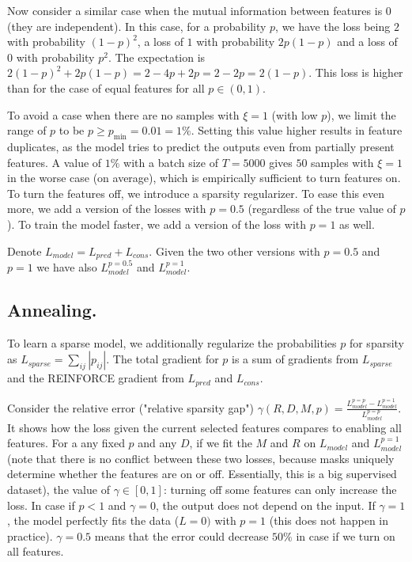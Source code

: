 \documentclass[a4paper,11pt,oneside]{report}
\begin{document}
Now consider a similar case when the mutual information between features is $0$ (they are independent). In this case, for a probability $p$, we have the loss being $2$ with probability $(1-p)^2$, a loss of $1$ with probability $2p(1-p)$ and a loss of $0$ with probability $p^2$. The expectation is $2(1-p)^2+2p(1-p)=2-4p+2p=2-2p=2(1-p)$. This loss is higher than for the case of equal features for all $p\in (0,1)$.

To avoid a case when there are no samples with $\xi=1$ (with low $p$), we limit the range of $p$ to be $p\geq p_{\min}=0.01=1\%$. Setting this value higher results in feature duplicates, as the model tries to predict the outputs even from partially present features. A value of $1\%$ with a batch size of $T=5000$ gives $50$ samples with $\xi=1$ in the worse case (on average), which is empirically sufficient to turn features on. To turn the features off, we introduce a sparsity regularizer. To ease this even more, we add a version of the losses with $p=0.5$ (regardless of the true value of $p$). To train the model faster, we add a version of the loss with $p=1$ as well.

Denote $L_{model}=L_{pred}+L_{cons}$. Given the two other versions with $p=0.5$ and $p=1$ we have also $L_{model}^{p=0.5}$ and $L_{model}^{p=1}$.

\subsection{Annealing.} To learn a sparse model, we additionally regularize the probabilities $p$ for sparsity as $L_{sparse}=\sum_{ij}|p_{ij}|$. The total gradient for $p$ is a sum of gradients from $L_{sparse}$ and the REINFORCE gradient from $L_{pred}$ and $L_{cons}$.

Consider the relative error ("relative sparsity gap") $\gamma(R, D, M, p)=\frac{L_{model}^{p=p}-L_{model}^{p=1}}{L_{model}^{p=p}}$. It shows how the loss given the current selected features compares to enabling all features. For a any fixed $p$ and any $D$, if we fit the $M$ and $R$ on $L_{model}$ and $L_{model}^{p=1}$ (note that there is no conflict between these two losses, because masks uniquely determine whether the features are on or off. Essentially, this is a big supervised dataset), the value of $\gamma\in[0, 1]$: turning off some features can only increase the loss. In case if $p<1$ and $\gamma=0$, the output does not depend on the input. If $\gamma=1$, the model perfectly fits the data ($L=0)$ with $p=1$ (this does not happen in practice). $\gamma=0.5$ means that the error could decrease $50\%$ in case if we turn on all features.
\end{document}
